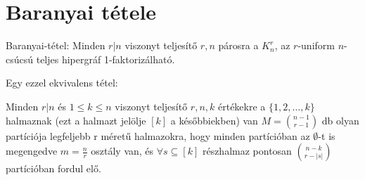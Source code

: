 \chapter{Baranyai tétele}








\begin{thm} Baranyai-tétel:
  Minden $r|n$ viszonyt teljesítő $r,n$ párosra a $K^{r}_{n}$, az $r$-uniform $n$-csúcsú teljes hipergráf 1-faktorizálható.
\end{thm}

Egy ezzel ekvivalens tétel:
\begin{thm}
  Minden $r|n$ és $1 \leq k \leq n$ viszonyt teljesítő $r,n,k$ értékekre a $\{1, 2, \dots, k\}$ halmaznak (ezt a halmazt jelölje $[k]$ a későbbiekben) van $M = \binom{n-1}{r-1}$ db olyan partíciója legfeljebb r méretű halmazokra, hogy minden partícióban az $\emptyset$-t is megengedve $m = \frac{n}{r}$ osztály van, és $\forall s \subseteq [k]$ részhalmaz pontosan $\binom{n-k}{r-|s|}$ partícióban fordul elő.
\end{thm}

